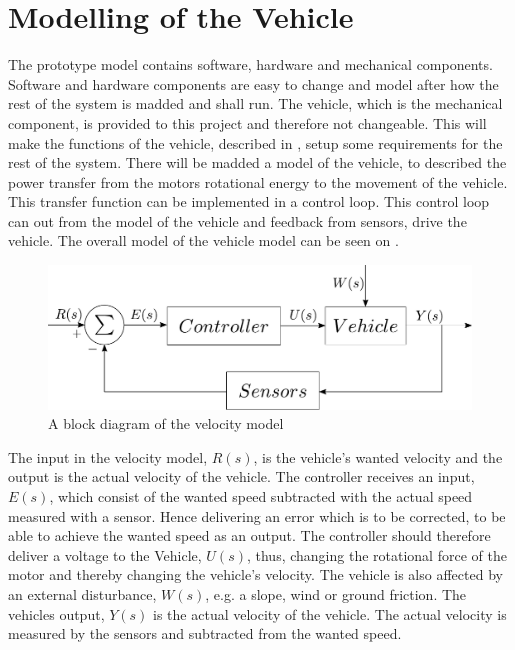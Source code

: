 \chapter{Modelling of the Vehicle}\label{cha:ModelOfVehicle}

The prototype model contains software, hardware and mechanical components. Software and hardware components are easy to change and model after how the rest of the system is madded and shall run. The vehicle, which is the mechanical component, is provided to this project and therefore not changeable. This will make the functions of the vehicle, described in , setup some requirements for the rest of the system. There will be madded a model of the vehicle, to described the power transfer from the motors rotational energy to the movement of the vehicle. This transfer function can be implemented in a control loop. This control loop can out from the model of the vehicle and feedback from sensors, drive the vehicle. The overall model of the vehicle model can be seen on .


\begin{figure}[H]
	\centering
	\includegraphics[scale=0.6]{figures/StartTotalModelsystem.pdf}
	\caption{A block diagram of the velocity model}
	\label{fig:StartTotalModelsystem}
\end{figure}

The input in the velocity model, $R(s)$, is the vehicle's wanted velocity and the output is the actual velocity of the vehicle. The controller receives an input, $E(s)$, which consist of the wanted speed subtracted with the actual speed measured with a sensor. Hence delivering an error which is to be corrected, to be able to achieve the wanted speed as an output. The controller should therefore deliver a voltage to the Vehicle, $U(s)$, thus, changing the rotational force of the motor and thereby changing the vehicle's velocity. The vehicle is also affected by an external disturbance, $W(s)$, e.g. a slope, wind or ground friction. The vehicles output, $Y(s)$ is the actual velocity of the vehicle. The actual velocity is measured by the sensors and subtracted from the wanted speed.

